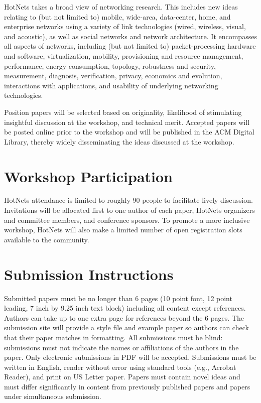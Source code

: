 \documentclass{hotnets16}
\begin{document}
HotNets takes a broad view of networking research. This includes new ideas relating to
(but not limited to) mobile, wide-area, data-center, home, and enterprise networks using a
variety of link technologies (wired, wireless, visual, and acoustic), as well as social networks
and network architecture. It encompasses all aspects of networks, including (but not limited to)
packet-processing hardware and software, virtualization, mobility, provisioning and resource management,
performance, energy consumption, topology, robustness and security, measurement, diagnosis,
verification, privacy, economics and evolution, interactions with applications, and usability
of underlying networking technologies.

Position papers will be selected based on originality, likelihood of
stimulating insightful discussion at the workshop, and technical
merit. Accepted papers will be posted online prior to the workshop and
will be published in the ACM Digital Library, thereby widely
disseminating the ideas discussed at the workshop.

\section{Workshop Participation}

HotNets attendance is limited to roughly 90 people to facilitate
lively discussion. Invitations will be allocated first to one author
of each paper, HotNets organizers and committee members, and
conference sponsors. To promote a more inclusive workshop, HotNets
will also make a limited number of open registration slots available
to the community.

\section{Submission Instructions}

Submitted papers must be no longer than 6 pages (10 point font, 12
point leading, 7 inch by 9.25 inch text block) including all content except
references. Authors can take up to one extra page for references
beyond the 6 pages. The submission site will provide a style file and
example paper so authors can check that their paper matches in
formatting. All submissions must be blind: submissions must not
indicate the names or affiliations of the authors in the paper. Only
electronic submissions in PDF will be accepted. Submissions must be
written in English, render without error using standard tools (e.g.,
Acrobat Reader), and print on US Letter paper. Papers must contain
novel ideas and must differ significantly in content from previously
published papers and papers under simultaneous submission.
\end{document}
